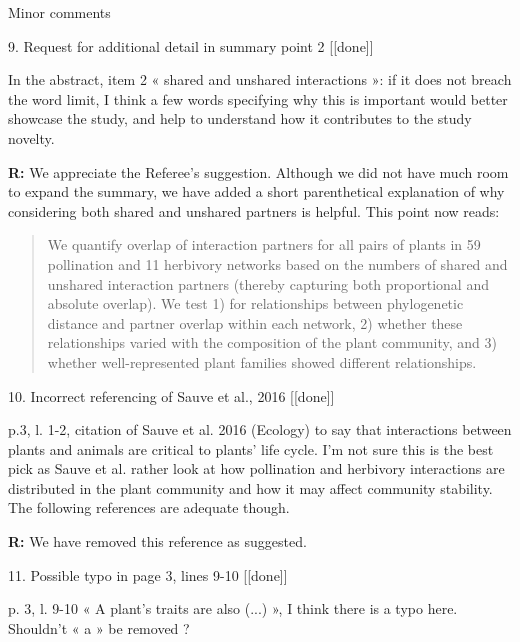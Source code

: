 \documentclass[12pt]{letter}
\newenvironment{refquote}{\bigskip \begin{it}}{\end{it}\smallskip}
\begin{document}
Minor comments

9. Request for additional detail in summary point 2 [[done]]

	\begin{refquote}
		In the abstract, item 2 « shared and unshared interactions »: if it does not breach the word limit, I think a few words specifying why this is important would better showcase the study, and help to understand how it contributes to the study novelty.
	\end{refquote}

	\textbf{R:} We appreciate the Referee's suggestion. Although we did not have much room to expand the summary, we have added a short parenthetical explanation of why considering both shared and unshared partners is helpful. This point now reads:

	\begin{quotation}

		\item We quantify overlap of interaction partners for all pairs of plants in 59 pollination and 11 herbivory networks based on the numbers of shared and unshared interaction partners (thereby capturing both proportional and absolute overlap). We test 1) for relationships between phylogenetic distance and partner overlap within each network, 2) whether these relationships varied with the composition of the plant community, and 3) whether well-represented plant families showed different relationships. 

	\end{quotation}


10. Incorrect referencing of Sauve et al., 2016 [[done]]

	\begin{refquote}
		p.3, l. 1-2, citation of Sauve et al. 2016 (Ecology) to say that interactions between plants and animals are critical to plants’ life cycle. I’m not sure this is the best pick as Sauve et al. rather look at how pollination and herbivory interactions are distributed in the plant community and how it may affect community stability. The following references are adequate though.
	\end{refquote}

	\textbf{R:} We have removed this reference as suggested.


11. Possible typo in page 3, lines 9-10 [[done]]
	
	\begin{refquote}
		p. 3, l. 9-10 « A plant’s traits are also (...) », I think there is a typo here. Shouldn’t « a » be removed ?
	\end{refquote}
\end{document}
